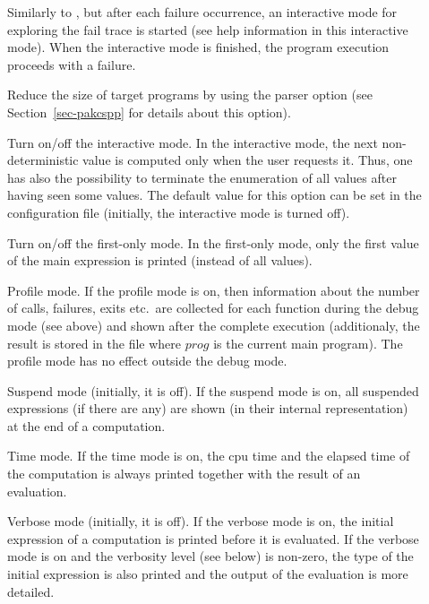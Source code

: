 \begin{description}
\item[]
Similarly to , but after each failure occurrence,
an interactive mode for exploring the fail trace is started
(see help information in this interactive mode).
When the interactive mode is finished, the program execution
proceeds with a failure.

\item[]
Reduce the size of target programs by using the
parser option 
(see Section~\ref{sec-pakcspp} for details about this option).

\item[]
Turn on/off the interactive mode.
In the interactive mode, the next non-deterministic value
is computed only when the user requests it.
Thus, one has also the possibility to terminate the
enumeration of all values after having seen some values.
The default value for this option can be set in the
configuration file \ccode{\curryrc} (initially, the interactive
mode is turned off).

\item[]
Turn on/off the first-only mode.
In the first-only mode, only the first value
of the main expression is printed (instead of all values).

\item[] Profile mode.
If the profile mode is on, then information about
the number of calls, failures, exits etc.\ are collected for
each function during the debug mode (see above) and shown
after the complete execution (additionaly, the result is stored
in the file  where $prog$ is the current main program).
The profile mode has no effect outside the debug mode.


\item[] Suspend mode (initially, it is off).
If the suspend mode is on, all suspended expressions
(if there are any) are shown (in their internal representation) at the end
of a computation.

\item[] Time mode. If the time mode is on,
the cpu time and the elapsed time
of the computation is always printed together with the result
of an evaluation.

\item[] Verbose mode (initially, it is off).
If the verbose mode is on,
the initial expression of a computation is printed before it is evaluated.
If the verbose mode is on and the verbosity level (see below)
is non-zero, the type of the initial expression is also printed
and the output of the evaluation is more detailed.


\end{description}
